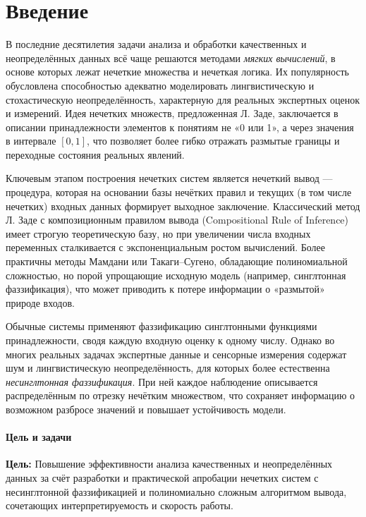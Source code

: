 \section{Введение}

В последние десятилетия задачи анализа и обработки качественных и неопределённых данных всё чаще решаются методами {\it мягких вычислений}, в основе которых лежат нечеткие множества и нечеткая логика. Их популярность обусловлена способностью адекватно моделировать лингвистическую и стохастическую неопределённость, характерную для реальных экспертных оценок и измерений. Идея нечетких множеств, предложенная Л. Заде, заключается в описании принадлежности элементов к понятиям не «0 или 1», а через значения в интервале $[0,1]$, что позволяет более гибко отражать размытые границы и переходные состояния реальных явлений.

Ключевым этапом построения нечетких систем является нечеткий вывод — процедура, которая на основании базы нечётких правил и текущих (в том числе нечетких) входных данных формирует выходное заключение. Классический метод Л. Заде с композиционным правилом вывода (Compositional Rule of Inference) имеет строгую теоретическую базу, но при увеличении числа входных переменных сталкивается с экспоненциальным ростом вычислений. Более практичны методы Мамдани или Такаги–Сугено, обладающие полиномиальной сложностью, но порой упрощающие исходную модель (например, синглтонная фаззификация), что может приводить к потере информации о «размытой» природе входов.

Обычные системы применяют фаззификацию синглтонными функциями принадлежности, сводя каждую входную оценку к одному числу. Однако во многих реальных задачах экспертные данные и сенсорные измерения содержат шум и лингвистическую неопределённость, для которых более естественна {\it несинглтонная фаззификация}. При ней каждое наблюдение описывается распределённым по отрезку нечётким множеством, что сохраняет информацию о возможном разбросе значений и повышает устойчивость модели.

\paragraph{Цель и задачи}

\textbf{Цель:} Повышение эффективности анализа качественных и неопределённых данных за счёт разработки и практической апробации нечетких систем с несинглтонной фаззификацией и полиномиально сложным алгоритмом вывода, сочетающих интерпретируемость и скорость работы.


